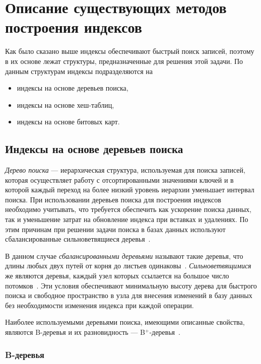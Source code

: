 \chapter{Описание существующих методов построения индексов\label{methods}}

Как было сказано выше индексы обеспечивают быстрый поиск записей, поэтому в их
основе лежат структуры, предназначенные для решения этой задачи. По данным
структурам индексы подразделяются на
\begin{itemize}
    \item индексы на основе деревьев поиска,
    \item индексы на основе хеш-таблиц,
    \item индексы на основе битовых карт.
\end{itemize}

\section{Индексы на основе деревьев поиска}

\textit{Дерево поиска} --- иерархическая структура, используемая для поиска
записей, которая осуществляет работу с отсортированными значениями ключей и в
которой каждый переход на более низкий уровень иерархии уменьшает интервал
поиска. При использовании деревьев поиска для построения индексов необходимо
учитывать, что требуется обеспечить как ускорение поиска данных, так и
уменьшение затрат на обновление индекса при вставках и удалениях. По этим
причинам при решении задачи поиска в базах данных используют сбалансированные
сильноветвящиеся деревья~\cite{arki}.

В данном случае \textit{сбалансированными деревьями} называют такие деревья, что
длины любых двух путей от корня до листьев одинаковы~\cite{encycl}.
\textit{Сильноветвящимися} же являются деревья, каждый узел которых ссылается на
большое число потомков~\cite{squares}.  Эти условия обеспечивают минимальную
высоту дерева для быстрого поиска и свободное пространство в узла для внесения
изменений в базу данных без необходимости изменения индекса при каждой операции.

Наиболее используемыми деревьями поиска, имеющими описанные свойства, являются
B-деревья и их разновидность --- B$^+$-деревья~\cite{arki}.

\subsection{B-деревья}

